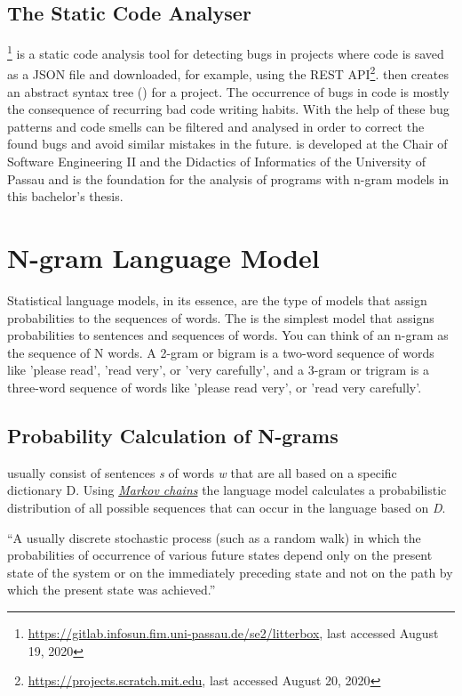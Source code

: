 \subsection{The Static \scratch{} Code Analyser \litterbox{}}\label{subsec:litterbox}
\litterbox{}\footnote{\url{https://gitlab.infosun.fim.uni-passau.de/se2/litterbox}, last accessed August 19, 2020} is a static code analysis tool for detecting bugs in \scratch{} projects where \scratch{} code is saved as a JSON file and downloaded, for example, using the \scratch{} REST API\footnote{\url{https://projects.scratch.mit.edu}, last accessed August 20, 2020}. \litterbox{} then creates an abstract syntax tree (\AST{}) for a \scratch{} project. The occurrence of bugs in code is mostly the consequence of recurring bad code writing habits. With the help of \litterbox{} these bug patterns and code smells can be filtered and analysed in order to correct the found bugs and avoid similar mistakes in the future. \litterbox{} is developed at the Chair of Software Engineering II and the Didactics of Informatics of the University of Passau and is the foundation for the analysis of \scratch{} programs with n-gram models in this bachelor's thesis. 


\section{N-gram Language Model}\label{sec:language-models}
Statistical language models, in its essence, are the type of models that assign probabilities to the sequences of words. The \ngram{} is the simplest model that assigns probabilities to sentences and sequences of words. You can think of an n-gram as the sequence of N words. A 2-gram or bigram is a two-word sequence of words like 'please read', 'read very', or 'very carefully', and a 3-gram or trigram is a three-word sequence of words like 'please read very', or 'read very carefully'. 

\subsection{Probability Calculation of N-grams}\label{subsec:ngram}
 usually consist of sentences \textit{s} of words \textit{w} that are all based on a specific dictionary {D}. Using \hyperref[def:markov_chain]{\textit{Markov chains}} the language model calculates a  probabilistic distribution of all possible sequences that can occur in the language based on \textit{D}.

\begin{definition}\label{def:markov_chain}
    ``A usually discrete stochastic process (such as a random walk) in which the probabilities of occurrence of various future states depend only on the present state of the system or on the immediately preceding state and not on the path by which the present state was achieved.''~\cite{markov_chain}
\end{definition} 

